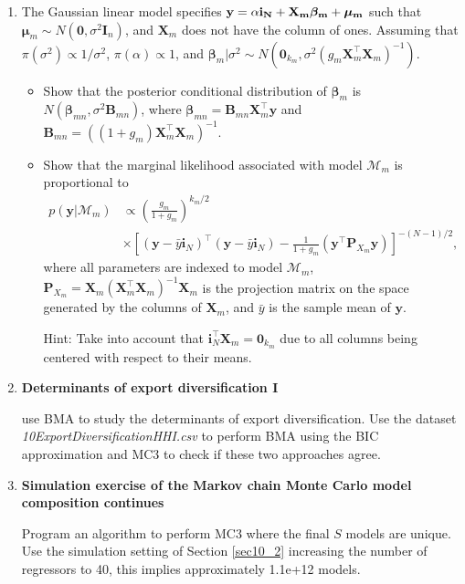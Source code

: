 \begin{enumerate}
	\item The Gaussian linear model specifies $\bf{y}=\alpha\bm{i}_N+\bm{X}_m\bm{\beta}_m+\bm{\mu}_m$ such that $\bm{\mu}_m\sim{N}(\bm{0},\sigma^2\bm{I}_n)$, and $\bm{X}_m$ does not have the column of ones. Assuming that $\pi(\sigma^2)\propto 1/{\sigma^2}$, $\pi(\alpha)\propto 1$, and $\bm{\beta}_m|\sigma^2 \sim {N}(\bm{0}_{k_m}, \sigma^2 (g_m\bm{X}_m^{\top}\bm{X}_m)^{-1})$.
	\begin{itemize}
		\item Show that the posterior conditional distribution of $\bm{\beta}_m$ is $N(\bm{\beta}_{mn},\sigma^2\bm{B}_{mn})$, where $\bm{\beta}_{mn}=\bm{B}_{mn}\bm{X}_m^{\top}\bm{y}$ and $\bm{B}_{mn}=((1+g_m)\bm{X}_m^{\top}\bm{X}_m)^{-1}$.
		\item Show that the marginal likelihood associated with model $\mathcal{M}_m$ is proportional to
		\begin{align*}
			p(\bm{y}|\mathcal{M}_m)&\propto \left(\frac{g_m}{1+g_m}\right)^{k_m/2}\\
			&\times \left[(\bm{y}-\bar{y}\bm{i}_N)^{\top}(\bm{y}-\bar{y}\bm{i}_N)-\frac{1}{1+g_m}(\bm{y}^{\top}\bm{P}_{X_m}\bm{y})\right]^{-(N-1)/2},
		\end{align*}
		where all parameters are indexed to model $\mathcal{M}_m$, $\bm{P}_{X_m}=\bm{X}_m(\bm{X}_m^{\top}\bm{X}_m)^{-1}\bm{X}_m$ is the projection matrix on the space generated by the columns of $\bm{X}_m$, and $\bar{y}$ is the sample mean of $\bm{y}$.
		
		Hint: Take into account that $\bm{i}_N^{\top}\bm{X}_m=\bm{0}_{k_m}$ due to all columns being centered with respect to their means.
	\end{itemize}

\item \textbf{Determinants of export diversification I}

\cite{Jetter2015} use BMA to study the determinants of export diversification. Use the dataset \textit{10ExportDiversificationHHI.csv} to perform BMA using the BIC approximation and MC3 to check if these two approaches agree. 

\item \textbf{Simulation exercise of the Markov chain Monte Carlo model composition continues}

Program an algorithm to perform MC3 where the final $S$ models are unique. Use the simulation setting of Section \ref{sec10_2} increasing the number of regressors to 40, this implies approximately 1.1e+12 models.


\end{enumerate}
